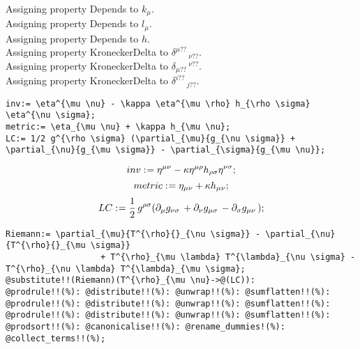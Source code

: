 \documentclass[11pt]{article}
\def\specialcolon{\mathrel{\mathop{:}}\hspace{-.5em}}
\begin{document}
\\
Assigning property Depends to ${k}_{\mu}$.
\\
Assigning property Depends to ${l}_{\mu}$.
\\
Assigning property Depends to $h$.
\\
Assigning property KroneckerDelta to ${\delta}^{\mu??}\,_{\nu??}$.
\\
Assigning property KroneckerDelta to ${\delta}_{\mu??}\,^{\nu??}$.
\\
Assigning property KroneckerDelta to ${\delta}^{i??}\,_{j??}$.
\\
{\color[named]{Blue}\begin{verbatim}
inv:= \eta^{\mu \nu} - \kappa \eta^{\mu \rho} h_{\rho \sigma} \eta^{\nu \sigma};
metric:= \eta_{\mu \nu} + \kappa h_{\mu \nu};
LC:= 1/2 g^{\rho \sigma} (\partial_{\mu}{g_{\nu \sigma}} + \partial_{\nu}{g_{\mu \sigma}} - \partial_{\sigma}{g_{\mu \nu}};
\end{verbatim}}
\begin{dmath*}[compact, spread=2pt]
inv\specialcolon{}= {\eta}^{\mu \nu} - \kappa {\eta}^{\mu \rho} {h}_{\rho \sigma} {\eta}^{\nu \sigma};
\end{dmath*}
\begin{dmath*}[compact, spread=2pt]
metric\specialcolon{}= {\eta}_{\mu \nu} + \kappa {h}_{\mu \nu};
\end{dmath*}
\begin{dmath*}[compact, spread=2pt]
LC\specialcolon{}= \frac{1}{2}\, {g}^{\rho \sigma} ({\partial}_{\mu}{{g}_{\nu \sigma}}\,  + {\partial}_{\nu}{{g}_{\mu \sigma}}\,  - {\partial}_{\sigma}{{g}_{\mu \nu}}\, );
\end{dmath*}
{\color[named]{Blue}\begin{verbatim}
Riemann:= \partial_{\mu}{T^{\rho}{}_{\nu \sigma}} - \partial_{\nu}{T^{\rho}{}_{\mu \sigma}}
                   + T^{\rho}_{\mu \lambda} T^{\lambda}_{\nu \sigma} - T^{\rho}_{\nu \lambda} T^{\lambda}_{\mu \sigma};
@substitute!!(Riemann)(T^{\rho}_{\mu \nu}->@(LC)):  
@prodrule!!(%): @distribute!!(%): @unwrap!!(%): @sumflatten!!(%):
@prodrule!!(%): @distribute!!(%): @unwrap!!(%): @sumflatten!!(%):
@prodrule!!(%): @distribute!!(%): @unwrap!!(%): @sumflatten!!(%):
@prodsort!!(%): @canonicalise!!(%): @rename_dummies!(%): @collect_terms!!(%);
\end{verbatim}}
\end{document}
